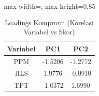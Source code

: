 \begin{table}[H]
\centering
\caption{Loadings Kompromi (Korelasi Variabel vs Skor)} \label{tab:loadings}
\begin{adjustbox}{max width=\textwidth, max height=0.85\textheight}
\begin{tabular}{|c|c|c|}
\hline
\textbf{Variabel} & \textbf{PC1} & \textbf{PC2} \\
\hline
PPM & -1.5206 & -1.2772 \\
RLS & 1.9776 & -0.0910 \\
TPT & -1.0372 & 1.6990 \\
\hline
\end{tabular}
\end{adjustbox}
\end{table}